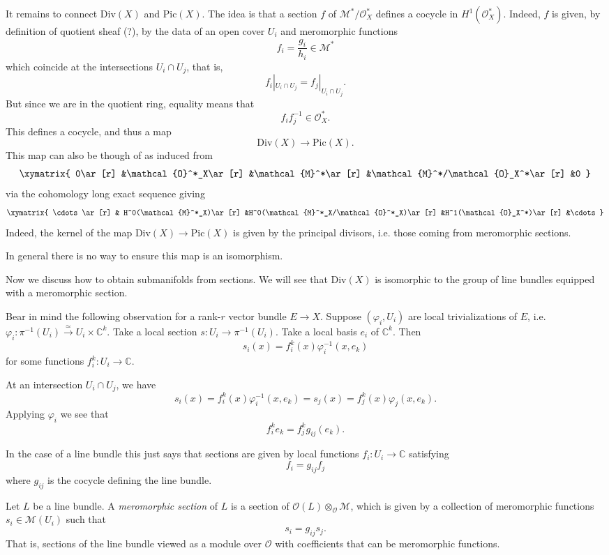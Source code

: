 \documentclass{book}
\begin{document}
\medskip\noindent
It remains to connect $\text{Div}(X)$ and
$\text{Pic}(X)$.
The idea is that a section $f$ of
$\mathcal{M}^*/\mathcal{O}_X^*$
defines a cocycle in $H^1(\mathcal{O}_X^*)$.
Indeed, $f$ is given, by definition of
quotient sheaf (?),
by the data of an open cover $U_i$ and
meromorphic functions
$$
f_i=\frac{g_i}{h_i} \in \mathcal{M}^*
$$
which coincide at the intersections $U_i \cap
U_j$,
that is,
$$
f_i|_{U_i\cap U_j} = f_j|_{U_i\cap U_j}.
$$
But since we are in the quotient ring,
equality means that
$$
f_i f_j^{-1} \in \mathcal{O}_X^*.
$$
This defines a cocycle, and thus a map
$$
\text{Div}(X) \to \text{Pic}(X).
$$
This map can also be though of as induced
from
$$
\xymatrix{
0\ar[r]
&\mathcal{O}^*_X\ar[r]
&\mathcal{M}^*\ar[r]
&\mathcal{M}^*/\mathcal{O}_X^*\ar[r]
&0
}
$$
via the cohomology long exact sequence giving
$$
\xymatrix{
\cdots\ar[r]
& H^0(\mathcal{M}^*_X)\ar[r]
&H^0(\mathcal{M}^*_X/\mathcal{O}^*_X)\ar[r]
&H^1(\mathcal{O}_X^*)\ar[r]
&\cdots
}
$$
Indeed, the kernel of the map $\text{Div}(X)
\to \text{Pic}(X)$
is given by the principal divisors,
i.e. those coming from meromorphic sections.

In general there is no way to ensure this map
is an isomorphism.

\medskip\noindent
Now we discuss how to obtain submanifolds
from sections.
We will see that $\text{Div}(X)$
is isomorphic to the group of line bundles
equipped with a meromorphic section.


Bear in mind the following observation for a
rank-$r$
vector bundle $E \to X$.
Suppose $(\varphi_i,U_i)$ are local
trivializations of $E$,
i.e. $\varphi_i:\pi^{-1}(U_i)
\xrightarrow{\simeq}U_i \times \mathbb{C}^k$.
Take a local section $s :U_i \to
\pi^{-1}(U_i)$.
Take a local basis $e_i$ of $\mathbb{C}^k$.
Then
$$
s_i(x)=f_i^k(x)\varphi_i^{-1}(x,e_k)
$$
for some functions $f_i^k:U_i \to
\mathbb{C}$.

At an intersection $U_i \cap U_j$,
we have
$$
s_i(x)=f_i^k(x)\varphi_i^{-1}(x,e_k)
=
s_j(x)=f_j^k(x)\varphi_j(x,e_k).
$$
Applying $\varphi_i$ we see that
$$
f_i^k e_k = f_j^k g_{ij}(e_k).
$$

In the case of a line bundle this just says
that sections
are given by local functions $f_i:U_i \to
\mathbb{C}$ satisfying
$$
f_i=g_{ij}f_j
$$
where $g_{ij}$ is the cocycle defining the
line bundle.

Let $L$ be a line bundle.
A {\it meromorphic section} of $L$ is a
section
of $\mathcal{O}(L)
\otimes_\mathcal{O}\mathcal{M}$,
which is given by a collection of meromorphic
functions
$s_i \in \mathcal{M}(U_i)$
such that
$$
s_i=g_{ij}s_j.
$$
That is, sections of the line bundle viewed
as a module over $\mathcal{O}$
with coefficients that can be meromorphic
functions.
\end{document}
